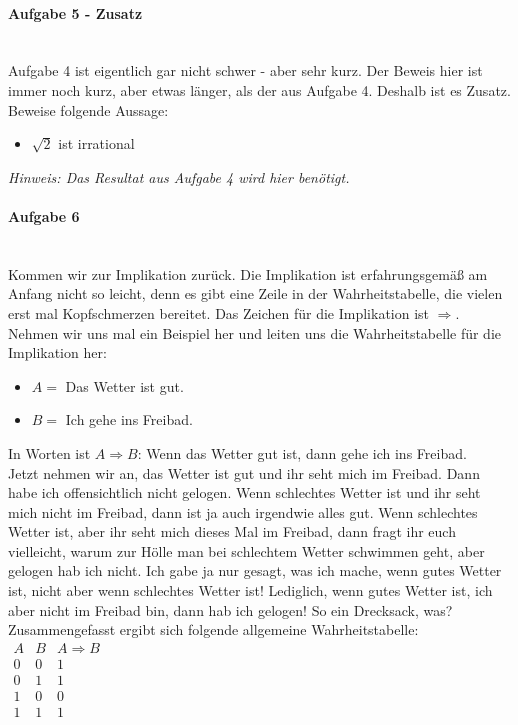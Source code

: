 \documentclass[12pt,a4paper,ngerman]{scrartcl}
\begin{document}
	\paragraph{Aufgabe 5 - Zusatz}\mbox{}\\
	Aufgabe 4 ist eigentlich gar nicht schwer - aber sehr kurz. Der Beweis hier ist immer noch kurz, aber etwas länger, als der aus Aufgabe 4. Deshalb ist es Zusatz.
	Beweise folgende Aussage:
	\begin{itemize}
		\item[] $\sqrt{2}$ ist irrational
	\end{itemize}
	\emph{Hinweis: Das Resultat aus Aufgabe 4 wird hier benötigt.}

	\paragraph{Aufgabe 6}\mbox{}\\
	Kommen wir zur Implikation zurück. Die Implikation ist erfahrungsgemäß am Anfang nicht so leicht, denn es gibt eine Zeile in der Wahrheitstabelle, die vielen erst mal Kopfschmerzen bereitet.
	Das Zeichen für die Implikation ist $\Rightarrow$. Nehmen wir uns mal ein Beispiel her und leiten uns die Wahrheitstabelle für die Implikation her:
	\begin{itemize}
		\item[] $A = $ Das Wetter ist gut.
		\item[] $B = $ Ich gehe ins Freibad.
	\end{itemize}
	In Worten ist $A \Rightarrow B$: Wenn das Wetter gut ist, dann gehe ich ins Freibad.\\
	Jetzt nehmen wir an, das Wetter ist gut und ihr seht mich im Freibad. Dann habe ich offensichtlich nicht gelogen. Wenn schlechtes Wetter ist und ihr seht mich nicht im Freibad, dann ist ja auch irgendwie alles gut. Wenn schlechtes Wetter ist, aber ihr seht mich dieses Mal im Freibad, dann fragt ihr euch vielleicht, warum  zur Hölle man bei schlechtem Wetter schwimmen geht, aber gelogen hab ich nicht. Ich gabe ja nur gesagt, was ich mache, wenn gutes Wetter ist, nicht aber wenn schlechtes Wetter ist! Lediglich, wenn gutes Wetter ist, ich aber nicht im Freibad bin, dann hab ich gelogen! So ein Drecksack, was?\\
	Zusammengefasst ergibt sich folgende allgemeine Wahrheitstabelle:\\
	$\begin{array}{cc|c}
		A & B & A \Rightarrow B\\
		\hline
		0 & 0 & 1\\
		0 & 1 & 1\\
		1 & 0 & 0\\
		1 & 1 & 1
	\end{array}$\\
\end{document}
